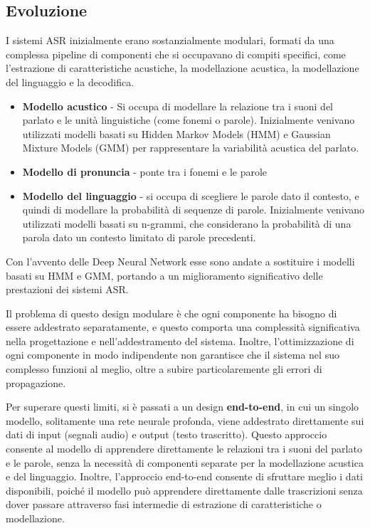 \documentclass[12pt, a4paper]{article}
\begin{document}
\subsection{Evoluzione}
I sistemi ASR inizialmente erano sostanzialmente modulari, formati da una complessa pipeline di componenti che si occupavano di compiti specifici, come l'estrazione di caratteristiche acustiche, la modellazione acustica, la modellazione del linguaggio e la decodifica.
\begin{itemize}
  \item \textbf{Modello acustico} - Si occupa di modellare la relazione tra i suoni del parlato e le unità linguistiche (come fonemi o parole). Inizialmente venivano utilizzati modelli basati su Hidden Markov Models (HMM) e Gaussian Mixture Models (GMM) per rappresentare la variabilità acustica del parlato.
  \item \textbf{Modello di pronuncia} - ponte tra i fonemi e le parole
  \item \textbf{Modello del linguaggio} - si occupa di scegliere le parole dato il contesto, e quindi di modellare la probabilità di sequenze di parole. Inizialmente venivano utilizzati modelli basati su n-grammi, che considerano la probabilità di una parola dato un contesto limitato di parole precedenti.
\end{itemize}

Con l'avvento delle Deep Neural Network esse sono andate a sostituire i modelli basati su HMM e GMM, portando a un miglioramento significativo delle prestazioni dei sistemi ASR.
\vspace{0.5em}

Il problema di questo design modulare è che ogni componente ha bisogno di essere addestrato separatamente, e questo comporta una complessità significativa nella progettazione e nell'addestramento del sistema. Inoltre, l'ottimizzazione di ogni componente in modo indipendente non garantisce che il sistema nel suo complesso funzioni al meglio, oltre a subire particolaremente gli errori di propagazione.
\vspace{0.5em}

Per superare questi limiti, si è passati a un design \textbf{end-to-end}, in cui un singolo modello, solitamente una rete neurale profonda, viene addestrato direttamente sui dati di input (segnali audio) e output (testo trascritto). Questo approccio consente al modello di apprendere direttamente le relazioni tra i suoni del parlato e le parole, senza la necessità di componenti separate per la modellazione acustica e del linguaggio. Inoltre, l'approccio end-to-end consente di sfruttare meglio i dati disponibili, poiché il modello può apprendere direttamente dalle trascrizioni senza dover passare attraverso fasi intermedie di estrazione di caratteristiche o modellazione.
\vspace{0.5em}
\end{document}
